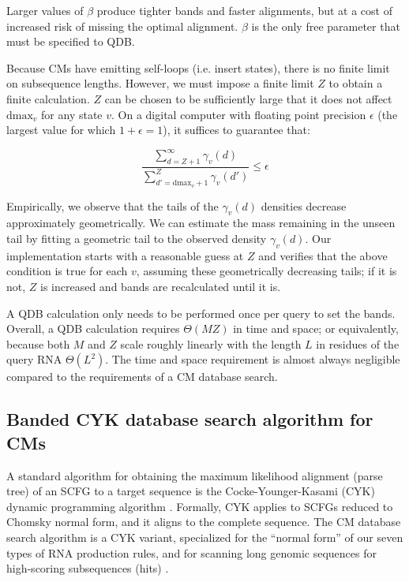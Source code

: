 \documentclass[11pt]{article}
\begin{document}
Larger values of $\beta$ produce tighter bands and faster alignments,
but at a cost of increased risk of missing the optimal
alignment. $\beta$ is the only free parameter that must be specified
to QDB.

Because CMs have emitting self-loops (i.e. insert states), there is no
finite limit on subsequence lengths. However, we must impose a finite
limit $Z$ to obtain a finite calculation.  $Z$ can be chosen to be
sufficiently large that it does not affect $\mbox{dmax}_v$ for any
state $v$.  On a digital computer with floating point precision
$\epsilon$ (the largest value for which $1+\epsilon = 1$), it suffices
to guarantee that:

\[
  \frac{ \sum_{d = Z+1}^{\infty}  \gamma_v(d)}
       { \sum_{d' = \mbox{dmax}_v + 1}^{Z} \gamma_v(d')}  \leq \epsilon
\]

Empirically, we observe that the tails of the $\gamma_v(d)$ densities
decrease approximately geometrically. We can estimate the mass
remaining in the unseen tail by fitting a geometric tail to the
observed density $\gamma_v(d)$. Our implementation starts with a
reasonable guess at $Z$ and verifies that the above condition is true
for each $v$, assuming these geometrically decreasing tails; if it is
not, $Z$ is increased and bands are recalculated until it is.

A QDB calculation only needs to be performed once per query to set the
bands. Overall, a QDB calculation requires $\Theta(MZ)$ in time and
space; or equivalently, because both $M$ and $Z$ scale roughly
linearly with the length $L$ in residues of the query RNA
$\Theta(L^2)$. The time and space requirement is almost always
negligible compared to the requirements of a CM database search.

\subsection{Banded CYK database search algorithm for CMs}

A standard algorithm for obtaining the maximum likelihood alignment
(parse tree) of an SCFG to a target sequence is the
Cocke-Younger-Kasami (CYK) dynamic programming algorithm
\cite{Kasami65,Younger67,HopcroftUllman79}. Formally, CYK applies to
SCFGs reduced to Chomsky normal form, and it aligns to the complete
sequence. The CM database search algorithm is a CYK variant,
specialized for the ``normal form'' of our seven types of RNA
production rules, and for scanning long genomic sequences for
high-scoring subsequences (hits) \cite{Durbin98}.
\end{document}
